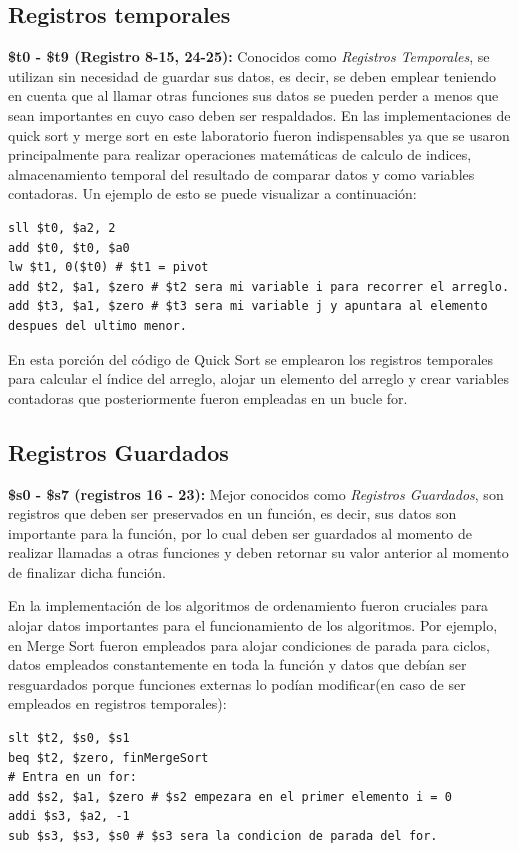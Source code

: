 \documentclass[12pt, a4paper]{article}
\begin{document}
        \subsection{Registros temporales}
            \textbf{\$t0 - \$t9 (Registro 8-15, 24-25):} Conocidos como \textit{Registros Temporales}, se utilizan sin necesidad de guardar sus datos, es decir, se deben emplear teniendo en cuenta que al llamar otras funciones sus datos se pueden perder a menos que sean importantes en cuyo caso deben ser respaldados.
            En las implementaciones de quick sort y merge sort en este laboratorio fueron indispensables ya que se usaron principalmente para realizar operaciones matemáticas de calculo de indices, almacenamiento temporal del resultado de comparar datos y como variables contadoras. Un ejemplo de esto se puede visualizar a continuación:
            \begin{lstlisting}
sll $t0, $a2, 2
add $t0, $t0, $a0
lw $t1, 0($t0) # $t1 = pivot
add $t2, $a1, $zero # $t2 sera mi variable i para recorrer el arreglo.
add $t3, $a1, $zero # $t3 sera mi variable j y apuntara al elemento despues del ultimo menor.
            \end{lstlisting}
            En esta porción del código de Quick Sort se emplearon los registros temporales para calcular el índice del arreglo, alojar un elemento del arreglo y crear variables contadoras que posteriormente fueron empleadas en un bucle for.
        \subsection{Registros Guardados}
            \textbf{\$s0 - \$s7 (registros 16 - 23):} Mejor conocidos como \textit{Registros Guardados}, son registros que deben ser preservados en un función, es decir, sus datos son importante para la función, por lo cual deben ser guardados al momento de realizar llamadas a otras funciones y deben retornar su valor anterior al momento de finalizar dicha función.
    
            En la implementación de los algoritmos de ordenamiento fueron cruciales para alojar datos importantes para el funcionamiento de los algoritmos. Por ejemplo, en Merge Sort fueron empleados para alojar condiciones de parada para ciclos, datos empleados constantemente en toda la función y datos que debían ser resguardados porque funciones externas lo podían modificar(en caso de ser empleados en registros temporales):
            \begin{lstlisting}
slt $t2, $s0, $s1
beq $t2, $zero, finMergeSort
# Entra en un for:
add $s2, $a1, $zero # $s2 empezara en el primer elemento i = 0
addi $s3, $a2, -1
sub $s3, $s3, $s0 # $s3 sera la condicion de parada del for.
            \end{lstlisting}
            \newpage
\end{document}
